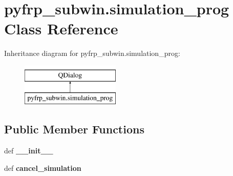 \hypertarget{classpyfrp__subwin_1_1simulation__prog}{\section{pyfrp\+\_\+subwin.\+simulation\+\_\+prog Class Reference}
\label{classpyfrp__subwin_1_1simulation__prog}
}
Inheritance diagram for pyfrp\+\_\+subwin.\+simulation\+\_\+prog\+:\begin{figure}[H]
\begin{center}
\leavevmode
\includegraphics[height=2.000000cm]{classpyfrp__subwin_1_1simulation__prog}
\end{center}
\end{figure}
\subsection*{Public Member Functions}
\begin{DoxyCompactItemize}
\item 
\hypertarget{classpyfrp__subwin_1_1simulation__prog_a5288d7ba12248a15dfe0e8f045676b77}{def {\bfseries \+\_\+\+\_\+init\+\_\+\+\_\+}}\label{classpyfrp__subwin_1_1simulation__prog_a5288d7ba12248a15dfe0e8f045676b77}

\item 
\hypertarget{classpyfrp__subwin_1_1simulation__prog_a851e30de5c542d5d3e36101f0e4b6e6b}{def {\bfseries cancel\+\_\+simulation}}\label{classpyfrp__subwin_1_1simulation__prog_a851e30de5c542d5d3e36101f0e4b6e6b}

\end{DoxyCompactItemize}
